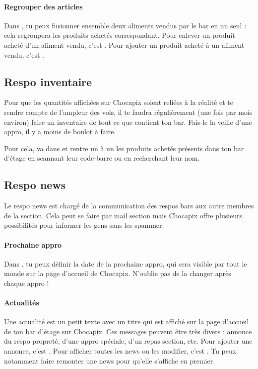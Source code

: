 \documentclass[12pt,french]{article}
\begin{document}
\paragraph{Regrouper des articles} Dans , tu peux fusionner ensemble deux aliments vendus par le bar en un seul : cela regroupera les produits achetés correspondant. Pour enlever un produit acheté d'un aliment vendu, c'est . Pour ajouter un produit acheté à un aliment vendu, c'est .

\subsection{Respo inventaire}

Pour que les quantités affichées sur Chocapix soient reliées à la réalité et te rendre compte de l'ampleur des vols, il te faudra régulièrement (une fois par mois environ) faire un inventaire de tout ce que contient ton bar. Fais-le la veille d'une appro, il y a moins de boulot à faire.

Pour cela, va dans  et rentre un à un les produits achetés présents dans ton bar d'étage en scannant leur code-barre ou en recherchant leur nom.

\subsection{Respo news}

Le respo news est chargé de la communication des respos bars aux autre membres de la section. Cela peut se faire par mail section mais Chocapix offre plusieurs possibilités pour informer les gens sans les spammer.

\paragraph{Prochaine appro} Dans , tu peux définir la date de la prochaine appro, qui sera visible par tout le monde sur la page d'accueil de Chocapix. N'oublie pas de la changer après chaque appro !

\paragraph{Actualités} Une actualité est un petit texte avec un titre qui est affiché sur la page d'accueil de ton bar d'étage sur Chocapix. Ces messages peuvent être très divers : annonce du respo propreté, d'une appro spéciale, d'un repas section, etc. Pour ajouter une annonce, c'est . Pour afficher toutes les news ou les modifier, c'est . Tu peux notamment faire remonter une news pour qu'elle s'affiche en premier.
\end{document}
